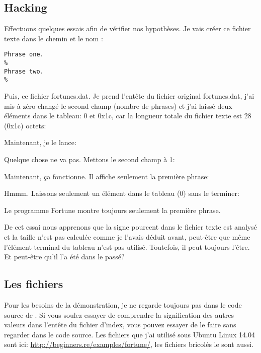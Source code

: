 \subsection{Hacking}

Effectuons quelques essais afin de vérifier nos hypothèses.
Je vais créer ce fichier texte dans le chemin et le nom :

\begin{lstlisting}
Phrase one.
%
Phrase two.
%
\end{lstlisting}

Puis, ce fichier fortunes.dat. Je prend l'entête du fichier original fortunes.dat,
j'ai mis à zéro changé le second champ (nombre de phrases) et j'ai laissé deux éléments
dans le tableau: 0 et 0x1c, car la longueur totale du fichier texte 
est 28 (0x1c) octets:



Maintenant, je le lance:



Quelque chose ne va pas. Mettons le second champ à 1:



Maintenant, ça fonctionne. Il affiche seulement la première phrase:



Hmmm. Laissons seulement un élément dans le tableau (0) sans le terminer:



Le programme Fortune montre toujours seulement la première phrase.

De cet essai nous apprenons que la signe pourcent dans le fichier texte est analysé
et la taille n'est pas calculée comme je l'avais déduit avant, peut-être que même
l'élément terminal du tableau n'est pas utilisé.
Toutefois, il peut toujours l'être. Et peut-être qu'il l'a été dans le passé?


\subsection{Les fichiers}

Pour les besoins de la démonstration, je ne regarde toujours pas dans le code source
de .
Si vous soulez essayer de comprendre la signification des autres valeurs dans l'entête
du fichier d'index, vous pouvez essayer de le faire sans regarder dans le code source.
Les fichiers que j'ai utilisé sous Ubuntu Linux 14.04 sont ici: \url{http://beginners.re/examples/fortune/},
les fichiers bricolés le sont aussi.

